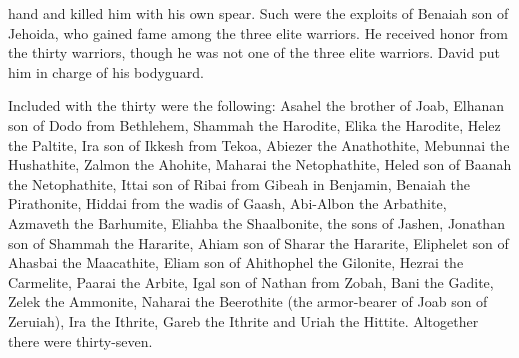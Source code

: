 {hand
and killed
him with his own spear.
Such
were the exploits
of Benaiah
son
of Jehoida,
who gained fame among
the three
elite warriors.
He received honor
from
the thirty
warriors, though he was not
one of the three
elite warriors. David
put
him in charge of
his bodyguard.
\par }{\PP {}Included with the thirty
were the following: Asahel
the brother
of Joab,
Elhanan
son
of Dodo
from Bethlehem,
Shammah
the Harodite,
Elika
the Harodite,
Helez
the Paltite,
Ira
son
of Ikkesh
from Tekoa,
Abiezer
the Anathothite,
Mebunnai
the Hushathite,
Zalmon
the Ahohite,
Maharai
the Netophathite,
Heled
son
of Baanah
the Netophathite,
Ittai
son
of Ribai
from Gibeah
in Benjamin,
Benaiah
the Pirathonite,
Hiddai
from the wadis
of Gaash,
Abi-Albon
the Arbathite,
Azmaveth
the Barhumite,
Eliahba
the Shaalbonite,
the sons
of Jashen,
Jonathan
son
of Shammah
the Hararite,
Ahiam
son
of Sharar
the Hararite,
Eliphelet
son
of Ahasbai
the Maacathite,
Eliam
son
of Ahithophel
the Gilonite,
Hezrai
the Carmelite,
Paarai
the Arbite,
Igal
son
of Nathan
from Zobah,
Bani
the Gadite,
Zelek
the Ammonite,
Naharai
the Beerothite
(the armor-bearer
of Joab
son
of Zeruiah),
Ira
the Ithrite,
Gareb
the Ithrite
and Uriah
the Hittite.
Altogether
there were thirty-seven.

}
